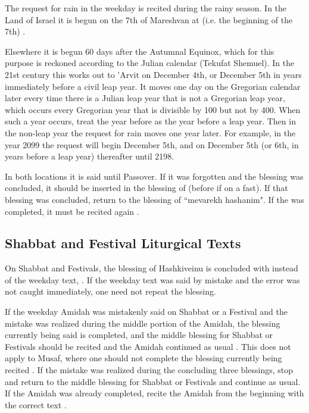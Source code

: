 The request for rain in the weekday \amidah is recited during the rainy season.  In the Land of Israel it is begun on the 7th of Mar\heth eshvan at \arvit\space (i.e. the beginning of the 7th) \parencite*[18:5 citing OC 117]{PH}.

Elsewhere it is begun 60 days after the Autumnal Equinox, which for this purpose is reckoned according to the Julian calendar (Tekufat Shemuel).  In the 21st century this works out to 'Arvit on December 4th, or December 5th in years immediately before a civil leap year.  It moves one day on the Gregorian calendar later every time there is a Julian leap year that is not a Gregorian leap year, which occurs every Gregorian year that is divisible by 100 but not by 400. When such a year occurs, treat the year before as the year before a leap year.  Then in the non-leap year the request for rain moves one year later.  For example, in the year 2099 the request will begin December 5th, and on December 5th (or 6th, in years before a leap year) thereafter until 2198.

In both locations it is said until Passover. If it was forgotten and the blessing was concluded, it should be inserted in the blessing of  (before  if on a fast). If that blessing was concluded, return to the blessing of ``mevarekh hashanim".  If the \amidah was completed, it must be recited again \parencite*{PH}.

\subsection{Shabbat and Festival Liturgical Texts}

On Shabbat and Festivals, the blessing of Hashkiveinu is concluded with  instead of the weekday text, .  If the weekday text was said by mistake and the error was not caught immediately, one need not repeat the blessing.

If the weekday Amidah was mistakenly said on Shabbat or a Festival and the mistake was realized during the middle portion of the Amidah, the blessing currently being said is completed, and the middle blessing for Shabbat or Festivals should be recited and the Amidah continued as usual \parencite*[76:16]{Kitzur}.  This does not apply to Musaf, where one should not complete the blessing currently being recited \parencite*[76:19]{Kitzur}.  If the mistake was realized during the concluding three blessings, stop and return to the middle blessing for Shabbat or Festivals and continue as usual. If the Amidah was already completed, recite the Amidah from the beginning with the correct text \parencite*[76:18]{Kitzur}.

